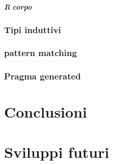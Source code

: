 \documentclass[12pt,a4paper]{report}
\begin{document}
\paragraph{Il corpo}

\subsection{Tipi induttivi}

\subsection{pattern matching}

\subsection{Pragma generated}

\chapter{Conclusioni}

\chapter{Sviluppi futuri}


\end{document}
